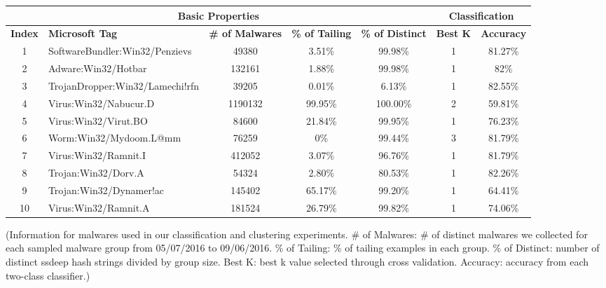 \begin{table*}
  \centering
  \scriptsize
  {
  \begin{tabular}{clccccc}
    \toprule
     \multicolumn{5}{c}{Basic Properties} &\multicolumn{2}{c}{Classification}\\
      \midrule
    {\bf Index} & {\bf Microsoft Tag} & {\bf \# of Malwares} & {\bf \% of Tailing}  & {\bf \% of Distinct} & {\bf Best K} & {\bf Accuracy}\\
    \midrule                                                                                                                                                                                                                                           
1  &  SoftwareBundler:Win32/Penzievs 	  & 49380	     & 3.51\%     & 99.98\%    & 1        & 81.27\%\\
2  &  Adware:Win32/Hotbar               & 132161     & 1.88\%     & 99.98\%    & 1        & 82\% \\
3  &  TrojanDropper:Win32/Lamechi!rfn	  & 39205	     & 0.01\%     & 6.13\%     & 1        & 82.55\%\\
4  &  Virus:Win32/Nabucur.D	            & 1190132    & 99.95\%    & 100.00\%   & 2        & 59.81\%\\
5  &  Virus:Win32/Virut.BO	            & 84600	     & 21.84\%    & 99.95\%    & 1        & 76.23\%\\
6  &  Worm:Win32/Mydoom.L@mm	          & 76259	     & 0\%        & 99.44\%    & 3        & 81.79\% \\
7  &  Virus:Win32/Ramnit.I              & 412052     & 3.07\%     & 96.76\%    & 1        & 81.79\%\\
8  &  Trojan:Win32/Dorv.A               & 54324      & 2.80\%     & 80.53\%    & 1        & 82.26\%\\
9  &  Trojan:Win32/Dynamer!ac           & 145402     & 65.17\%    & 99.20\%    & 1        & 64.41\%\\
10 &  Virus:Win32/Ramnit.A              & 181524     & 26.79\%    & 99.82\%    & 1        & 74.06\%\\   

\bottomrule
   \end{tabular}
   }
{\footnotesize{(Information for malwares used in our classification and clustering experiments. \# of Malwares: \# of distinct malwares we collected for each sampled malware group from 05/07/2016 to 09/06/2016. \% of Tailing: \% of tailing examples in each group. \% of Distinct: number of distinct ssdeep hash strings divided by group size.
Best K: best k value selected through cross validation. Accuracy: accuracy from each two-class classifier.)}}
\end{table*}


